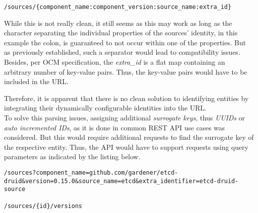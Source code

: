 \begin{lstlisting}[caption=REST API Source Endpoint, captionpos=b, label=lst:RESTAPISourceEndpoint]
/sources/{component_name:component_version:source_name:extra_id}
\end{lstlisting}

While this is not really clean, it still seems as this may work as long as the character separating the individual properties of the sources' identity, in this example the colon, is guaranteed to not occur within one of the properties. But as previously established, such a separator would lead to compatibility issues. Besides, per OCM specification, the \emph{extra\_id} is a flat map containing an arbitrary number of key-value pairs. Thus, the key-value pairs would have to be included in the URL.\par
Therefore, it is apparent that there is no clean solution to identifying entities by integrating their dynamically configurable identities into the URL.\\

To solve this parsing issues, assigning additional \emph{surrogate keys}, thus \emph{UUIDs} or \emph{auto incremented IDs}, as it is done in common REST API use cases was considered. But this would require additional requests to find the surrogate key of the respective entity. Thus, the API would have to support requests using query parameters as indicated by the listing below.

\begin{lstlisting}[caption=Querying for Entitiy ID, captionpos=b, label=lst:QueryingForEntityID]
/sources?component_name=github.com/gardener/etcd-druid&version=0.15.0&source_name=etcd&extra_identifier=etcd-druid-source

/sources/{id}/versions
\end{lstlisting}

